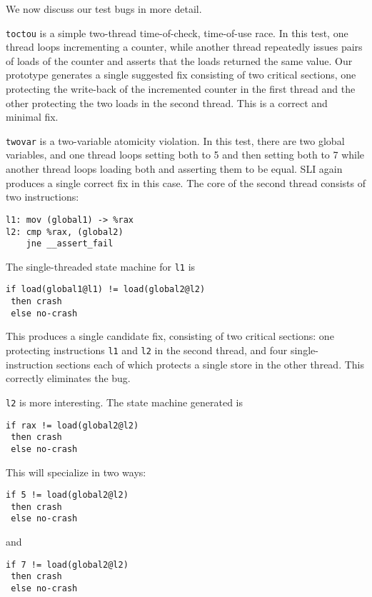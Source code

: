 \documentclass[10pt,twocolumn,preprint,natbib,authoryear]{sigplanconf}
\begin{document}
We now discuss our test bugs in more detail.

\verb|toctou| is a simple two-thread time-of-check, time-of-use race.
In this test, one thread loops incrementing a counter, while another
thread repeatedly issues pairs of loads of the counter and asserts
that the loads returned the same value.  Our prototype generates a
single suggested fix consisting of two critical sections, one
protecting the write-back of the incremented counter in the first
thread and the other protecting the two loads in the second thread.
This is a correct and minimal fix.

\verb|twovar| is a two-variable atomicity violation.  In this test,
there are two global variables, and one thread loops setting both to 5
and then setting both to 7 while another thread loops loading both and
asserting them to be equal.  SLI again produces a single correct fix
in this case.  The core of the second thread consists of two
instructions:

\begin{verbatim}
l1: mov (global1) -> %rax
l2: cmp %rax, (global2)
    jne __assert_fail
\end{verbatim}

The single-threaded state machine for \verb|l1| is

\begin{verbatim}
if load(global1@l1) != load(global2@l2)
 then crash
 else no-crash
\end{verbatim}

\noindent
This produces a single candidate fix, consisting of two critical
sections: one protecting instructions \verb|l1| and \verb|l2| in the
second thread, and four single-instruction sections each of which
protects a single store in the other thread.  This correctly
eliminates the bug.

\verb|l2| is more interesting.  The state machine generated is

\begin{verbatim}
if rax != load(global2@l2)
 then crash
 else no-crash
\end{verbatim}

\noindent
This will specialize in two ways:

\begin{verbatim}
if 5 != load(global2@l2)
 then crash
 else no-crash
\end{verbatim}

\noindent{}and

\begin{verbatim}
if 7 != load(global2@l2)
 then crash
 else no-crash
\end{verbatim}
\end{document}
